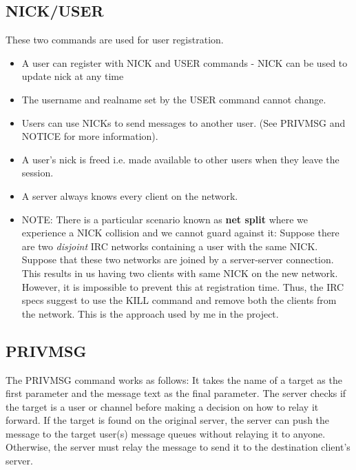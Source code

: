 \documentclass[letterpaper,twocolumn,10pt]{article}
\begin{document}
\subsection{NICK/USER}

These two commands are used for user registration.

\begin{itemize}

	\item A user can register with NICK and USER commands - NICK can be used to
	      update nick at any time

	\item The username and realname set by the USER command cannot change.

	\item Users can use NICKs to send messages to another user. (See PRIVMSG
	      and NOTICE for more information).

	\item A user's nick is freed i.e. made available to other users when they
	      leave the session.

	\item A server always knows every client on the network.

	\item NOTE: There is a particular scenario known as \textbf{net split} where
	      we experience a NICK collision and we cannot guard against it:
	      Suppose there are two \textit{disjoint} IRC networks
	      containing a user with the same NICK. Suppose that these two networks are joined by a
	      server-server connection. This results in us having two clients with same NICK
	      on the new network. However, it is impossible to prevent this at
	      registration time. Thus, the IRC specs suggest to use the KILL command and
	      remove both the clients from the network. This is the approach used by
	      me in the project.

\end{itemize}

\subsection{PRIVMSG}

The PRIVMSG command works as follows: It takes the name of a target as the first parameter and the message
text as the final parameter. The server checks if the target is a user or
channel before making a decision on how to relay it forward. If the target is
found on the original server, the server can push the message to the target
user(s) message queues without relaying it to anyone. Otherwise, the server
must relay the message to send it to the destination client's server.
\end{document}
